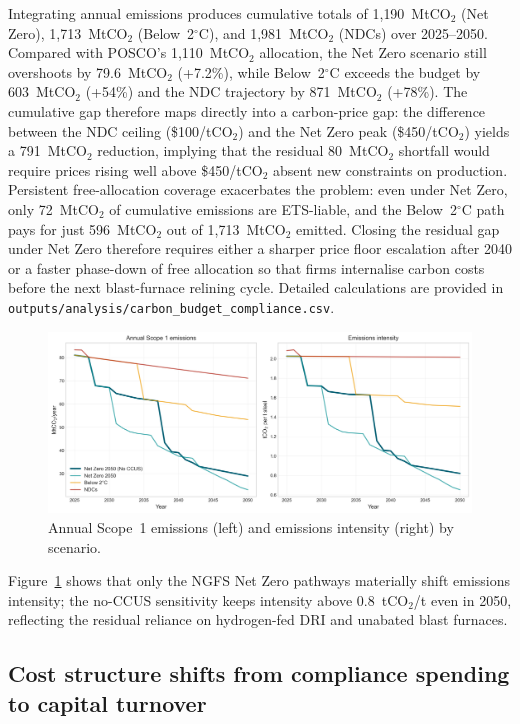 \documentclass[preprint,1p,authoryear]{elsarticle}
\begin{document}
Integrating annual emissions produces cumulative totals of 1{,}190~MtCO$_2$ (Net Zero), 1{,}713~MtCO$_2$ (Below~2$^\circ$C), and 1{,}981~MtCO$_2$ (NDCs) over 2025--2050. Compared with POSCO's 1{,}110~MtCO$_2$ allocation, the Net Zero scenario still overshoots by 79.6~MtCO$_2$ (+7.2\%), while Below~2$^\circ$C exceeds the budget by 603~MtCO$_2$ (+54\%) and the NDC trajectory by 871~MtCO$_2$ (+78\%). The cumulative gap therefore maps directly into a carbon-price gap: the difference between the NDC ceiling (\$100/tCO$_2$) and the Net Zero peak (\$450/tCO$_2$) yields a 791~MtCO$_2$ reduction, implying that the residual 80~MtCO$_2$ shortfall would require prices rising well above \$450/tCO$_2$ absent new constraints on production. Persistent free-allocation coverage exacerbates the problem: even under Net Zero, only 72~MtCO$_2$ of cumulative emissions are ETS-liable, and the Below~2$^\circ$C path pays for just 596~MtCO$_2$ out of 1,713~MtCO$_2$ emitted. Closing the residual gap under Net Zero therefore requires either a sharper price floor escalation after 2040 or a faster phase-down of free allocation so that firms internalise carbon costs before the next blast-furnace relining cycle. Detailed calculations are provided in \texttt{outputs/analysis/carbon\_budget\_compliance.csv}.

\begin{figure}[!t]
  \centering
  \includegraphics[width=0.85\linewidth]{emissions_pathways}
  \caption{Annual Scope~1 emissions (left) and emissions intensity (right) by scenario.}
  \label{fig:emissions-pathways}
\end{figure}

Figure~\ref{fig:emissions-pathways} shows that only the NGFS Net Zero pathways materially shift emissions intensity; the no-CCUS sensitivity keeps intensity above 0.8~tCO$_2$/t even in 2050, reflecting the residual reliance on hydrogen-fed DRI and unabated blast furnaces.

\subsection{Cost structure shifts from compliance spending to capital turnover}
\end{document}
